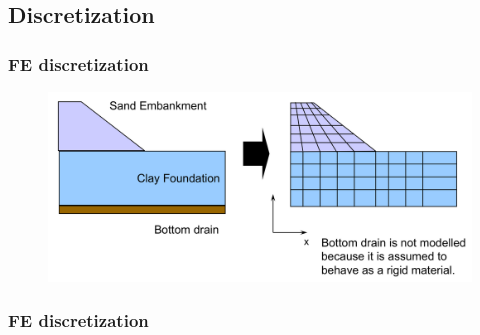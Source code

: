 \documentclass[notes]{beamer}
\begin{document}
\subsection{Discretization}
\begin{frame}
\frametitle{FE discretization}
\begin{figure}[ht]
	\centering
	\includegraphics[width=\textwidth]{figs/discretization.png}
\end{figure}
\end{frame}


\begin{frame}
\frametitle{FE discretization}
\end{frame}
\end{document}
